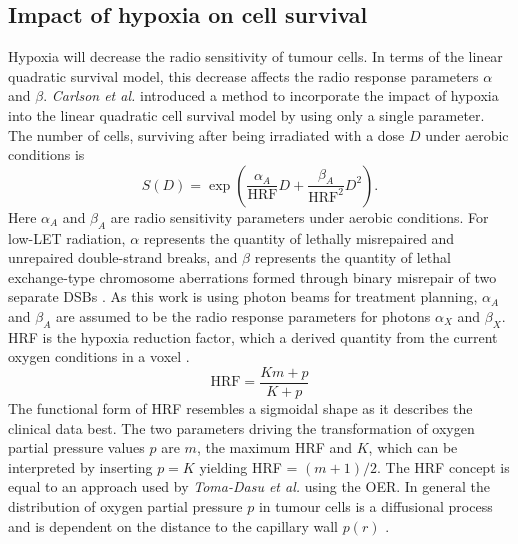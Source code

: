 \subsection{Impact of hypoxia on cell survival}
Hypoxia will decrease the radio sensitivity of tumour cells. In terms of the linear quadratic survival model, this decrease affects the radio response parameters $\alpha$ and $\beta$. \textit{Carlson et al.} \cite{pmid17022202} introduced a method to incorporate the impact of hypoxia into the linear quadratic cell survival model by using only a single parameter. The number of cells, surviving after being irradiated with a dose $D$ under aerobic conditions is
\begin{equation}
S(D) = \exp\left(\frac{\alpha_A}{\mathrm{HRF}}D + \frac{\beta_A}{\mathrm{HRF}^2}D^2\right).
\end{equation}
Here $\alpha_A$ and $\beta_A$ are radio sensitivity parameters under aerobic conditions. For low-LET radiation, $\alpha$ represents the quantity of lethally misrepaired and unrepaired double-strand breaks, and $\beta$ represents the quantity of lethal exchange-type chromosome aberrations formed through binary misrepair of two separate DSBs \cite{pmid18363426}. As this work is using photon beams for treatment planning, $\alpha_A$ and $\beta_A$ are assumed to be the radio response parameters for photons $\alpha_X$ and $\beta_X$. HRF is the hypoxia reduction factor, which a derived quantity from the current oxygen conditions in a voxel \cite{pmid21183291}.
\begin{equation}\label{eq:hrfmodel}
\mathrm{HRF} = \frac{Km + p}{K+p}
\end{equation}
The functional form of HRF resembles a sigmoidal shape as it describes the clinical data best. The two parameters driving the transformation of oxygen partial pressure values $p$ are $m$, the maximum HRF and $K$, which can be interpreted by inserting $p=K$ yielding HRF = $(m+1)/2$. The HRF concept is equal to an approach used by \textit{Toma-Dasu et al.} \cite{pmid21871003} using the OER. In general the distribution of oxygen partial pressure $p$ in tumour cells is a diffusional process and is dependent on the distance to the capillary wall $p(r)$ \cite{pmid5067983}.

